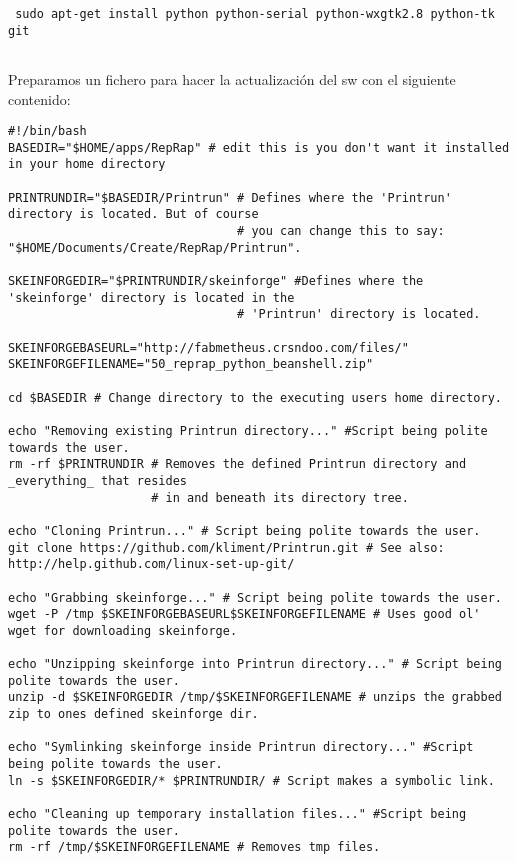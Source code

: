 \begin{verbatim}
 sudo apt-get install python python-serial python-wxgtk2.8 python-tk git
      
\end{verbatim}

Preparamos un fichero para hacer la actualización del sw con el
siguiente contenido:

\begin{verbatim}
#!/bin/bash
BASEDIR="$HOME/apps/RepRap" # edit this is you don't want it installed in your home directory

PRINTRUNDIR="$BASEDIR/Printrun" # Defines where the 'Printrun' directory is located. But of course
                                # you can change this to say: "$HOME/Documents/Create/RepRap/Printrun".

SKEINFORGEDIR="$PRINTRUNDIR/skeinforge" #Defines where the 'skeinforge' directory is located in the
                                # 'Printrun' directory is located.

SKEINFORGEBASEURL="http://fabmetheus.crsndoo.com/files/"
SKEINFORGEFILENAME="50_reprap_python_beanshell.zip"

cd $BASEDIR # Change directory to the executing users home directory.

echo "Removing existing Printrun directory..." #Script being polite towards the user.
rm -rf $PRINTRUNDIR # Removes the defined Printrun directory and _everything_ that resides
                    # in and beneath its directory tree.

echo "Cloning Printrun..." # Script being polite towards the user.
git clone https://github.com/kliment/Printrun.git # See also: http://help.github.com/linux-set-up-git/

echo "Grabbing skeinforge..." # Script being polite towards the user.
wget -P /tmp $SKEINFORGEBASEURL$SKEINFORGEFILENAME # Uses good ol' wget for downloading skeinforge.

echo "Unzipping skeinforge into Printrun directory..." # Script being polite towards the user.
unzip -d $SKEINFORGEDIR /tmp/$SKEINFORGEFILENAME # unzips the grabbed zip to ones defined skeinforge dir.

echo "Symlinking skeinforge inside Printrun directory..." #Script being polite towards the user.
ln -s $SKEINFORGEDIR/* $PRINTRUNDIR/ # Script makes a symbolic link.

echo "Cleaning up temporary installation files..." #Script being polite towards the user.
rm -rf /tmp/$SKEINFORGEFILENAME # Removes tmp files.
      
\end{verbatim}

